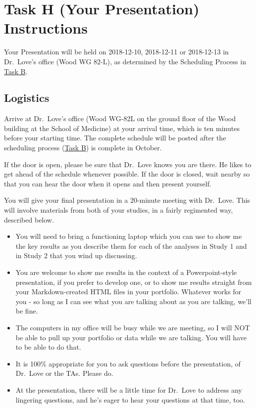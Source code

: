 \documentclass[]{book}
\providecommand{\tightlist}{%
  \setlength{\itemsep}{0pt}\setlength{\parskip}{0pt}}
\theoremstyle{definition}
\theoremstyle{definition}
\theoremstyle{definition}
\theoremstyle{remark}
\begin{document}
\hypertarget{taskH}{%
\chapter{Task H (Your Presentation) Instructions}\label{taskH}}

Your Presentation will be held on 2018-12-10, 2018-12-11 or 2018-12-13
in Dr.~Love's office (Wood WG 82-L), as determined by the Scheduling
Process in \protect\hyperlink{taskB}{Task B}.

\hypertarget{logistics}{%
\section{Logistics}\label{logistics}}

Arrive at Dr.~Love's office (Wood WG-82L on the ground floor of the Wood
building at the School of Medicine) at your arrival time, which is ten
minutes before your starting time. The complete schedule will be posted
after the scheduling process (\protect\hyperlink{taskB}{Task B}) is
complete in October.

If the door is open, please be sure that Dr.~Love knows you are there.
He likes to get ahead of the schedule whenever possible. If the door is
closed, wait nearby so that you can hear the door when it opens and then
present yourself.

You will give your final presentation in a 20-minute meeting with
Dr.~Love. This will involve materials from both of your studies, in a
fairly regimented way, described below.

\begin{itemize}
\tightlist
\item
  You will need to bring a functioning laptop which you can use to show
  me the key results as you describe them for each of the analyses in
  Study 1 and in Study 2 that you wind up discussing.
\item
  You are welcome to show me results in the context of a
  Powerpoint-style presentation, if you prefer to develop one, or to
  show me results straight from your Markdown-created HTML files in your
  portfolio. Whatever works for you - so long as I can see what you are
  talking about as you are talking, we'll be fine.
\item
  The computers in my office will be busy while we are meeting, so I
  will NOT be able to pull up your portfolio or data while we are
  talking. You will have to be able to do that.
\item
  It is 100\% appropriate for you to ask questions before the
  presentation, of Dr.~Love or the TAs. Please do.
\item
  At the presentation, there will be a little time for Dr.~Love to
  address any lingering questions, and he's eager to hear your questions
  at that time, too.
\end{itemize}
\end{document}
